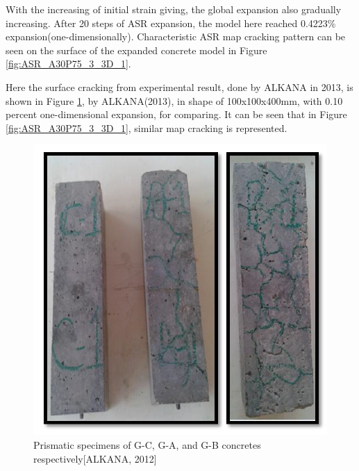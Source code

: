 With the increasing of initial strain giving, the global expansion also gradually increasing. After 20 steps of ASR expansion, the model here reached 0.4223\% expansion(one-dimensionally). Characteristic ASR map cracking pattern can be seen on the surface of the expanded concrete model in Figure \ref{fig:ASR_A30P75_3_3D_1}.

Here the surface cracking from experimental result, done by ALKANA in 2013, is shown in Figure \ref{ALKANASRcrack}, by ALKANA(2013)\cite{ALKANA}, in shape of 100x100x400mm, with 0.10 percent one-dimensional expansion, for comparing. It can be seen that in Figure \ref{fig:ASR_A30P75_3_3D_1}, similar map cracking is represented.

  \begin{figure}[ht!]
  \centering
  \includegraphics[width=.8\linewidth]{Reference/ALKANASRcrack.png}
    \caption{Prismatic specimens of G-C, G-A, and G-B concretes respectively[ALKANA, 2012]}
    \label{ALKANASRcrack}
  \end{figure}


